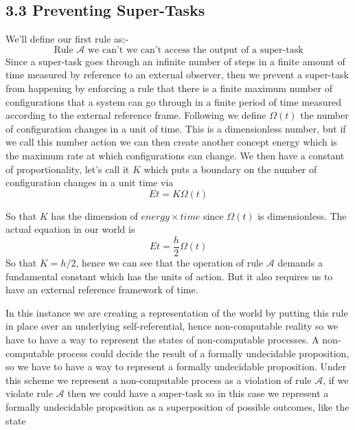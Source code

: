 \documentclass[
   ,final            %
  ]
  {aipproc}
\begin{document}
\subsection{3.3 Preventing Super-Tasks}
\par
We'll define our first rule as;-
\begin{equation}
\text{Rule }\mathcal{A} \text{ we can't we can't access the output of a super-task}
\end{equation}
Since a super-task goes through an infinite number of steps in a finite amount of time measured by reference to an external observer, then we prevent %
a super-task from happening by enforcing a rule that there is a finite maximum number of
configurations that a system can go through in a finite period of time measured according to the external reference
frame. Following \citet{Margolus_03} we define $\Omega(t)$ the number of configuration changes in a unit of time.
This is a dimensionless number, but if we call this number action we can then create another concept energy
which is the maximum rate at which configurations can change. We then have a constant of proportionality,
let's call it $K$ which puts a boundary on the number of configuration changes in a unit time via
\begin{equation}
Et=K\Omega(t)
\end{equation}
\par
So that $K$ has the dimension of $energy \times time$ since $\Omega(t)$ is dimensionless. The actual equation in our world 
is
\begin{equation}
Et=\frac{h}{2}\Omega(t)
\end{equation}
So that $K=h/2$, hence we can see that the operation of rule $\mathcal{A}$ demands a fundamental constant which has the units of action. But it also %
requires us to have an external reference framework of time.
\par
In this instance we are creating a representation of the world by putting this
rule in place over an underlying self-referential, hence non-computable reality so we have to have a way to
represent the states of non-computable processes. A non-computable process could decide the result of a formally undecidable proposition, so we have %
to have a way to represent a formally undecidable proposition. Under this scheme we represent a non-computable process as
a violation of rule $\mathcal{A}$, if we violate rule $\mathcal{A}$ then we could have a super-task so in this case we represent a formally %
undecidable proposition as a superposition of possible outcomes, like the state
\end{document}
